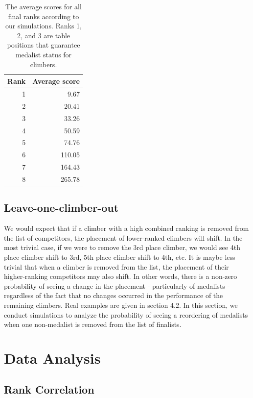\documentclass[12pt]{article}
\begin{document}
\begin{table}[ht]
\centering
\caption{The average scores for all final ranks according to our simulations. Ranks 1, 2, and 3 are table positions that guarantee medalist status for climbers.} 
\begin{tabular}{rr}
  \hline
Rank & Average score \\ 
  \hline
  1 & 9.67 \\ 
    2 & 20.41 \\ 
    3 & 33.26 \\ 
    4 & 50.59 \\ 
    5 & 74.76 \\ 
    6 & 110.05 \\ 
    7 & 164.43 \\ 
    8 & 265.78 \\ 
   \hline
\end{tabular}
\end{table}

\hypertarget{leave-one-climber-out}{%
\subsection{Leave-one-climber-out}\label{leave-one-climber-out}}

We would expect that if a climber with a high combined ranking is
removed from the list of competitors, the placement of lower-ranked
climbers will shift. In the most trivial case, if we were to remove the
3rd place climber, we would see 4th place climber shift to 3rd, 5th
place climber shift to 4th, etc. It is maybe less trivial that when a
climber is removed from the list, the placement of their higher-ranking
competitors may also shift. In other words, there is a non-zero
probability of seeing a change in the placement - particularly of
medalists - regardless of the fact that no changes occurred in the
performance of the remaining climbers. Real examples are given in
section 4.2. In this section, we conduct simulations to analyze the
probability of seeing a reordering of medalists when one non-medalist is
removed from the list of finalists.

\hypertarget{data-analysis}{%
\section{Data Analysis}\label{data-analysis}}

\hypertarget{rank-correlation}{%
\subsection{Rank Correlation}\label{rank-correlation}}
\end{document}
